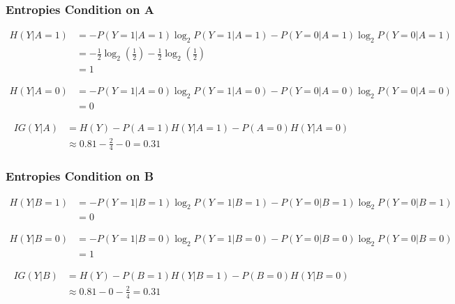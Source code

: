 \documentclass[aspectratio=169, 10pt]{beamer}
\begin{document}
\begin{frame}
\frametitle{Entropies Condition on A}
\small

\[
    \begin{split}
        H(Y | A=1) & = -P(Y=1 | A=1) \log_2 P(Y=1 | A=1) -P(Y=0 | A=1) \log_2 P(Y=0 | A=1) \\
                   & = -\frac{1}{2} \log_2(\frac{1}{2}) -\frac{1}{2} \log_2(\frac{1}{2}) \\
                   & = 1
    \end{split}
\]

\[
    \begin{split}
        H(Y | A=0) & = -P(Y=1 | A=0) \log_2 P(Y=1 | A=0) -P(Y=0 | A=0) \log_2 P(Y=0 | A=0) \\
                   & = 0
    \end{split}
\]

\[
    \begin{split}
        IG(Y | A) & =  H(Y) - P(A=1)H(Y | A=1) - P(A=0)H(Y | A=0)\\
                  & \approx 0.81 - \frac{2}{4} - 0 = 0.31
    \end{split}
\]

\end{frame}

\begin{frame}
    \frametitle{Entropies Condition on B}
    \small
    
    \[
        \begin{split}
            H(Y | B=1) & = -P(Y=1 | B=1) \log_2 P(Y=1 | B=1) -P(Y=0 | B=1) \log_2 P(Y=0 | B=1) \\
                       & = 0
        \end{split}
    \]
    
    \[
        \begin{split}
            H(Y | B=0) & = -P(Y=1 | B=0) \log_2 P(Y=1 | B=0) -P(Y=0 | B=0) \log_2 P(Y=0 | B=0) \\
                       & = 1
        \end{split}
    \]
    
    \[
        \begin{split}
            IG(Y | B) & =  H(Y) - P(B=1)H(Y | B=1) - P(B=0)H(Y | B=0)\\
                      & \approx 0.81 - 0 - \frac{2}{4} = 0.31
        \end{split}
    \]
    
\end{frame}
\end{document}
